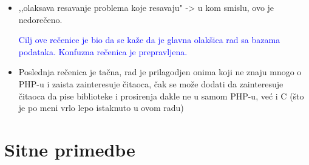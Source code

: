 \documentclass[a4paper]{report}
\newcommand{\odgovor}[1]{\textcolor{blue}{#1}}
\begin{document}
\begin{itemize}
\item ,,olaksava resavanje problema koje resavaju" -> u kom smislu, ovo je nedorečeno.

\odgovor{Cilj ove rečenice je bio da se kaže da je glavna olakšica rad sa bazama podataka. Konfuzna rečenica je prepravljena.}

\item Poslednja rečenica je tačna, rad je prilagodjen onima koji ne znaju mnogo o PHP-u i zaista zainteresuje čitaoca, čak se može dodati da zainteresuje čitaoca da pise biblioteke i prosirenja dakle ne u samom PHP-u, već i C (što je po meni vrlo lepo istaknuto u ovom radu)
\end{itemize}


\section{Sitne primedbe}
\end{document}
